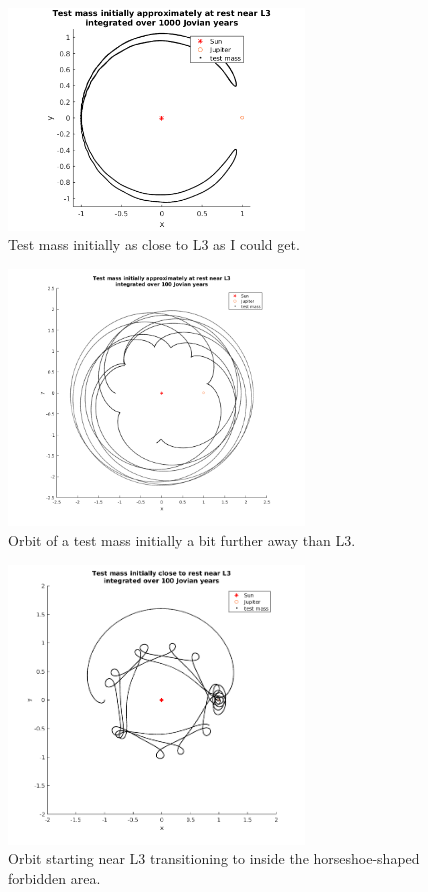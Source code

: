 \documentclass[12pt,a4paper,titlepage]{article}
\begin{document}
\begin{figure}
\centering
\includegraphics[width=0.7\textwidth]{../plots/L3-stationary.png}
\caption{Test mass initially as close to L3 as I could get.}
\label{L3-stable}
\end{figure}

\begin{figure}
\centering
\includegraphics[width=0.7\textwidth]{../plots/L3-left.png}
\caption{Orbit of a test mass initially a bit further away than L3.}
\label{L3-left}
\end{figure}

\begin{figure}
\centering
\includegraphics[width=0.7\textwidth]{../plots/L3-left3-100yr.png}
\caption{Orbit starting near L3 transitioning to inside the horseshoe-shaped forbidden area.}
\label{L3-left2}
\end{figure}
\end{document}
